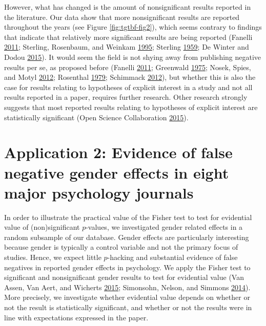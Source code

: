 \documentclass[a5paper]{book}
\begin{document}
However, what has changed is the amount of nonsignificant results
reported in the literature. Our data show that more nonsignificant
results are reported throughout the years (see Figure
\ref{fig:tgtbf-fig2}), which seems contrary to findings that indicate
that relatively more significant results are being reported (Fanelli
\protect\hyperlink{ref-doi:10.1007ux2fs11192-011-0494-7}{2011};
Sterling, Rosenbaum, and Weinkam
\protect\hyperlink{ref-doi:10.2307ux2f2684823}{1995}; Sterling
\protect\hyperlink{ref-doi:10.2307ux2f2282137}{1959}; De Winter and
Dodou \protect\hyperlink{ref-doi:10.7717ux2fpeerj.733}{2015}). It would
seem the field is not shying away from publishing negative results per
se, as proposed before (Fanelli
\protect\hyperlink{ref-doi:10.1007ux2fs11192-011-0494-7}{2011};
Greenwald \protect\hyperlink{ref-doi:10.1037ux2fh0076157}{1975}; Nosek,
Spies, and Motyl
\protect\hyperlink{ref-doi:10.1177ux2f1745691612459058}{2012}; Rosenthal
\protect\hyperlink{ref-doi:10.1037ux2f0033-2909.86.3.638}{1979};
Schimmack \protect\hyperlink{ref-doi:10.1037ux2fa0029487}{2012}), but
whether this is also the case for results relating to hypotheses of
explicit interest in a study and not all results reported in a paper,
requires further research. Other research strongly suggests that most
reported results relating to hypotheses of explicit interest are
statistically significant (Open Science Collaboration
\protect\hyperlink{ref-doi:10.1126ux2fscience.aac4716}{2015}).

\section{Application 2: Evidence of false negative gender effects in
eight major psychology
journals}\label{application-2-evidence-of-false-negative-gender-effects-in-eight-major-psychology-journals}

In order to illustrate the practical value of the Fisher test to test
for evidential value of (non)significant \(p\)-values, we investigated
gender related effects in a random subsample of our database. Gender
effects are particularly interesting because gender is typically a
control variable and not the primary focus of studies. Hence, we expect
little \(p\)-hacking and substantial evidence of false negatives in
reported gender effects in psychology. We apply the Fisher test to
significant and nonsignificant gender results to test for evidential
value (Van Assen, Van Aert, and Wicherts
\protect\hyperlink{ref-doi:10.1037ux2fmet0000025}{2015}; Simonsohn,
Nelson, and Simmons
\protect\hyperlink{ref-doi:10.1037ux2fa0033242}{2014}). More precisely,
we investigate whether evidential value depends on whether or not the
result is statistically significant, and whether or not the results were
in line with expectations expressed in the paper.
\end{document}
